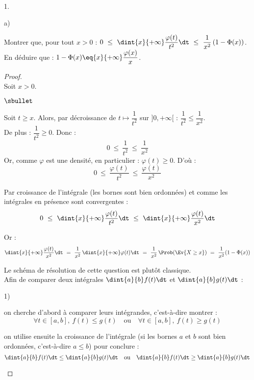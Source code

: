 \begin{noliste}{1.}
\begin{noliste}{a)}
    \item Montrer que, pour tout $x>0$ : $0 \ \leq \ \dint{x}{+\infty}  
    \dfrac{\varphi(t)}{t^2} \dt \ \leq \ \dfrac{1}{x^2}\, 
    (1-\Phi(x))$.\\
    En déduire que : $1-\Phi(x) \eq{x}{+\infty} 
    \dfrac{\varphi(x)}{x}$.
    
    \begin{proof}~\\
      Soit $x>0$.
      \begin{noliste}{$\sbullet$}
      \item Soit $t \geq x$. Alors, par décroissance de $t\mapsto 
      \dfrac{1}{t^2}$ sur $]0,+\infty[$ : $ \dfrac{1}{t^2} \leq 
      \dfrac{1}{x^2}$.\\
      De plus : $\dfrac{1}{t^2} \geq 0$. Donc : 
      \[
        0 \ \leq \ \dfrac{1}{t^2} \ \leq \ \dfrac{1}{x^2}
      \]
      Or, comme $\varphi$ est une densité, en particulier : 
      $\varphi(t) \geq 0$. D'où :
      \[
        0 \ \leq \ \dfrac{\varphi(t)}{t^2} \ \leq \ 
        \dfrac{\varphi(t)}{x^2}
      \]
      
    \item Par croissance de l'intégrale (les bornes sont bien
      ordonnées) et comme les intégrales en présence sont convergentes
      :
      \[
        0 \ \leq \ \dint{x}{+\infty} \dfrac{\varphi(t)}{t^2} \dt \
        \leq \ \dint{x}{+\infty} \dfrac{\varphi(t)}{x^2} \dt
      \]
      
      \item Or :
      \[
        \dint{x}{+\infty} \dfrac{\varphi(t)}{x^2} \dt \ = \
        \dfrac{1}{x^2} \, \dint{x}{+\infty} \varphi(t) \dt \ = \
        \dfrac{1}{x^2} \, \Prob(\Ev{X \geq x}) \ = \
        \dfrac{1}{x^2} (1-\Phi(x))
      \]
      \end{noliste}
      
      
      \newpage
      
      
      \begin{remark}
        Le schéma de résolution de cette question est plutôt 
	classique.\\
        Afin de comparer deux intégrales $\dint{a}{b} f(t) \dt$ et 
        $\dint{a}{b} g(t) \dt$ :
        \begin{noliste}{\scriptsize 1)}
	  \item on cherche d'abord à comparer leurs 
	  intégrandes, c'est-à-dire montrer :
	  \[
	    \forall t \in [a,b], \ f(t) \leq g(t) \quad \text{ou} \quad 
	    \forall t \in [a,b], \ f(t) \geq g(t)
	  \]
	  \item on utilise ensuite la croissance de l'intégrale (si 
	  les bornes $a$ et $b$ sont bien ordonnées, c'est-à-dire 
	  $a \leq b$) pour conclure :
	  \[
	    \dint{a}{b} f(t) \dt \leq \dint{a}{b} g(t) \dt \quad 
	    \text{ou} \quad \dint{a}{b} f(t) \dt \geq 
	    \dint{a}{b} g(t) \dt
	  \]
        \end{noliste}
      \end{remark}
      

\end{proof}
\end{noliste}
\end{noliste}
